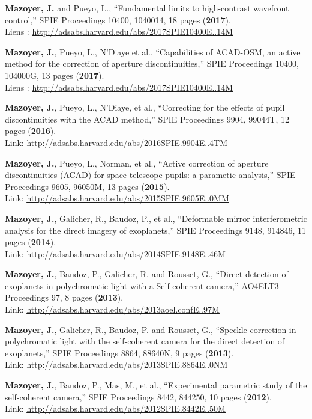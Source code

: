 \documentclass[12pt]{article}
\begin{document}
\begin{etaremune}

\item \textbf{Mazoyer, J.} and Pueyo, L., “Fundamental limits to high-contrast wavefront control,” SPIE Proceedings 10400, 1040014, 18 pages (\textbf{2017}).\\
Liens : \textcolor{BrickRed}{\underline{\url{http://adsabs.harvard.edu/abs/2017SPIE10400E..14M}}}
\item \textbf{Mazoyer, J.}, Pueyo, L., N’Diaye et al., “Capabilities of ACAD-OSM, an active method for the correction of aperture discontinuities,” SPIE Proceedings 10400, 104000G, 13 pages (\textbf{2017}).\\
Liens : \textcolor{BrickRed}{\underline{\url{http://adsabs.harvard.edu/abs/2017SPIE10400E..14M}}}
\item \textbf{Mazoyer, J.}, Pueyo, L., N’Diaye, et al., “Correcting for the effects of pupil discontinuities with the ACAD method,” SPIE Proceedings 9904, 99044T, 12 pages (\textbf{2016}).\\
Link: \textcolor{BrickRed}{\underline{\url{http://adsabs.harvard.edu/abs/2016SPIE.9904E..4TM}}}
\item \textbf{Mazoyer, J.}, Pueyo, L., Norman, et al., “Active correction of aperture discontinuities (ACAD) for space telescope pupils: a parametic analysis,” SPIE Proceedings 9605, 96050M, 13 pages (\textbf{2015}).\\
Link: \textcolor{BrickRed}{\underline{\url{http://adsabs.harvard.edu/abs/2015SPIE.9605E..0MM}}}
\item \textbf{Mazoyer, J.}, Galicher, R., Baudoz, P., et al., “Deformable mirror interferometric analysis for the direct imagery of exoplanets,” SPIE Proceedings 9148, 914846, 11 pages (\textbf{2014}).\\
Link: \textcolor{BrickRed}{\underline{\url{http://adsabs.harvard.edu/abs/2014SPIE.9148E..46M}}}
\item \textbf{Mazoyer, J.}, Baudoz, P., Galicher, R. and Rousset, G., “Direct detection of exoplanets in polychromatic light with a Self-coherent camera,” AO4ELT3 Proceedings 97, 8 pages (\textbf{2013}).\\
Link: \textcolor{BrickRed}{\underline{\url{http://adsabs.harvard.edu/abs/2013aoel.confE..97M}}}
\item \textbf{Mazoyer, J.}, Galicher, R., Baudoz, P. and Rousset, G., “Speckle correction in polychromatic light with the self-coherent camera for the direct detection of exoplanets,” SPIE Proceedings 8864, 88640N, 9 pages (\textbf{2013}).\\
Link: \textcolor{BrickRed}{\underline{\url{http://adsabs.harvard.edu/abs/2013SPIE.8864E..0NM}}}
\item \textbf{Mazoyer, J.}, Baudoz, P., Mas, M., et al., “Experimental parametric study of the self-coherent camera,” SPIE Proceedings 8442, 844250, 10 pages (\textbf{2012}).\\
Link: \textcolor{BrickRed}{\underline{\url{http://adsabs.harvard.edu/abs/2012SPIE.8442E..50M}}}


\end{etaremune}
\end{document}

